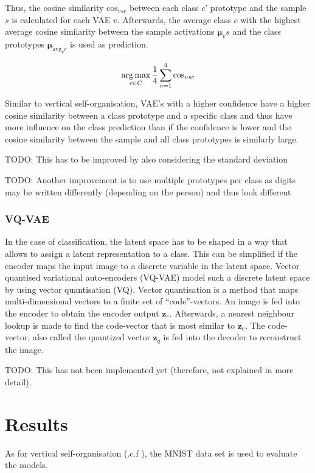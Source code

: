 Thus, the cosine similarity $\text{cos}_{vsc}$ between each class $c$' prototype and the sample $s$ is calculated for each VAE $v$.
Afterwards, the average class $c$ with the highest average cosine similarity between the sample activations $\boldsymbol{\mu}_vs$ and the class prototypes $\boldsymbol{\mu}_{\text{avg}_vc}$ is used as prediction.

\begin{equation}\eqlbl{hso_14}
		\argmax_{c \in C} \frac{1}{4} \sum_{v=1}^{4} \text{cos}_{vsc}
\end{equation}

Similar to vertical self-organisation, VAE's with a higher confidence have a higher cosine similarity between a class prototype and a specific class and thus have more influence on the class prediction than if the confidence is lower and the cosine similarity between the sample and all class prototypes is similarly large.

TODO: This has to be improved by also considering the standard deviation


TODO: Another improvement is to use multiple prototypes per class as digits may be written differently (depending on the person) and thus look different


\subsubsection{VQ-VAE}
In the case of classification, the latent space has to be shaped in a way that allows to assign a latent representation to a class.
This can be simplified if the encoder maps the input image to a discrete variable in the latent space.
Vector quantised variational auto-encoders (VQ-VAE)  model such a discrete latent space by using vector quantisation (VQ).
Vector quantisation is a method that maps multi-dimensional vectors to a finite set of ``code''-vectors.
An image is fed into the encoder to obtain the encoder output $\boldsymbol{z}_e$.
Afterwards, a nearest neighbour lookup is made to find the code-vector that is most similar to $\boldsymbol{z}_e$.
The code-vector, also called the quantized vector $\boldsymbol{z}_q$ is fed into the decoder to reconstruct the image.


TODO: This has not been implemented yet (therefore, not explained in more detail).


\section{Results}
As for vertical self-organisation (.c.f ), the MNIST data set is used to evaluate the models. 


